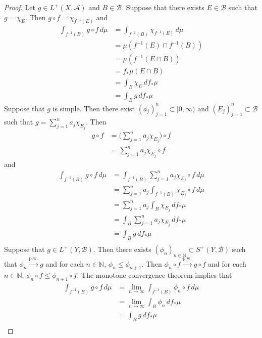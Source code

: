 \documentclass{book}
\theoremstyle{definition}
\newcommand{\N}{\mathbb{N}}
\newcommand{\MA}{\mathcal{A}}
\newcommand{\MB}{\mathcal{B}}
\DeclareMathOperator*{\0}{\mbf{0}}
\DeclareMathOperator*{\1}{\mbf{1}}
\newcommand{\limn}{\lim \limits_{n \rightarrow \infty}}
\newcommand{\convt}[1]{\xrightarrow{\text{#1}}}
\newcommand{\Rg}{[0,\infty)}
\newcommand{\dmu}{\, d \mu}
\begin{document}
	\begin{proof}
		Let $g \in  L^+(X, \MA)$ and $B \in \MB$. Suppose that there exists $E \in \MB$ such that $g = \chi_E$. Then $g \circ f = \chi_{f^{-1}(E)}$ and
		\begin{align*}
			\int_{f^{-1}(B)} g \circ f \dmu
			& = \int_{f^{-1}(B)} \chi_{f^{-1}(E)} \dmu \\
			& = \mu(f^{-1}(E) \cap f^{-1}(B)) \\
			& = \mu( f^{-1}(E \cap B)) \\
			& = f_*\mu (E \cap B) \\
			& = \int_{B} \chi_{E} \, df_*\mu \\
			& = \int_{B} g \, df_*\mu 
 		\end{align*}
 		Suppose that $g$ is simple. Then there exist $(a_j)_{j=1}^n \subset \Rg$ and $(E_j)_{j=1}^n \subset \MB$ such that $g = \sum\limits_{j=1}^n a_j \chi_{E_j}$. 
 		Then 
 		\begin{align*}
 			g \circ f 
 			& = \bigg( \sum\limits_{j=1}^n a_j \chi_{E_j} \bigg) \circ f\\
 			& = \sum\limits_{j=1}^n a_j \chi_{E_j} \circ f
 		\end{align*}
 		and 
 		\begin{align*}
 			\int_{f^{-1}(B)} g \circ f \dmu
 			& = \int_{f^{-1}(B)} \sum\limits_{j=1}^n a_j \chi_{E_j} \circ f \dmu \\
 			& = \sum_{j=1}^n a_j \int_{f^{-1}(B)} \chi_{E_j} \circ f \dmu \\
 			& = \sum_{j=1}^n a_j \int_{B} \chi_{E_j} \, d f_*\mu \\
 			& = \int_{B} \sum_{j=1}^n a_j  \chi_{E_j} \, d f_*\mu \\
 			& = \int_{B} g \, d f_*\mu \\
 		\end{align*}
 		Suppose that $g \in L^+(Y, \MB)$. Then there exists $(\phi_n)_{n \in \N} \subset S^+(Y, \MB)$ such that $\phi_n \convt{p.w.} g$ and for each $n \in \N$, $\phi_n \leq \phi_{n+1}$. Then $\phi_n \circ f \convt{p.w.} g \circ f$ and for each $n \in \N$, $\phi_n \circ f \leq \phi_{n+1} \circ f$. The monotone convergence theorem implies that 
 		\begin{align*}
 			\int_{f^{-1}(B)} g \circ f \dmu
 			& = \limn \int_{f^{-1}(B)} \phi_n \circ f \dmu \\
 			& = \limn \int_{B} \phi_n \, d f_*\mu \\
 			& = \int_{B} g \, d f_*\mu \\
 		\end{align*}
	\end{proof}
\end{document}

